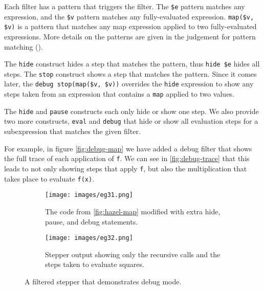 Each filter has a pattern that triggers the filter. The \verb|$e|
pattern matches any expression, and the \verb|$v| pattern matches any
fully-evaluated expression. \verb|map($v, $v)| is a pattern that
matches any map expression applied to two fully-evaluated
expressions. More details on the patterns are given in
the judgement for pattern matching ().

The \verb|hide| construct hides a step that matches the pattern, thus
\verb|hide $e| hides all steps. The \verb|stop| construct shows a
step that matches the pattern. Since it comes later, the
\verb|debug stop(map($v, $v))| overrides the \verb|hide| expression to show
any steps taken from an expression that contains a \verb|map| applied
to two values.

The \verb|hide| and \verb|pause| constructs each only hide or show one
step. We also provide two more constructs, \verb|eval| and
\verb|debug| that hide or show all evaluation steps for a
subexpression that matches the given filter.

For example, in figure \autoref{fig:debug-map} we have added a debug
filter that shows the full trace of each application of \verb|f|. We
can see in \autoref{fig:debug-trace} that this leads to not only
showing steps that apply \verb|f|, but also the multiplication that
takes place to evaluate \verb|f(x)|.

\begin{figure}
    \centering
    \begin{minipage}{.40\linewidth}
    \begin{subfigure}{\linewidth}
        \texttt{[image: images/eg31.png]}
        \caption{The code from \autoref{fig:hazel-map} modified with extra hide, pause, and debug statements.}
        \label{fig:debug-map}
    \end{subfigure}
    \end{minipage}
    \hfill
    \begin{minipage}{.57\linewidth}
    \begin{subfigure}{\linewidth}
        \texttt{[image: images/eg32.png]}
        \caption{Stepper output showing only the recursive calls and the steps taken to evaluate squares.}
        \label{fig:debug-trace}
    \end{subfigure}
    \end{minipage}
    \caption{A filtered stepper that demonstrates debug mode.}
\end{figure}

